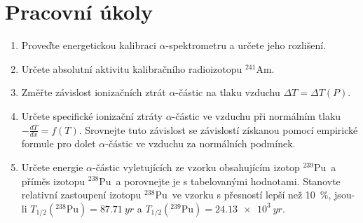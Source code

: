 \documentclass[a4paper]{article}
\author{Vladislav Wohlrath}
\newcommand{\Am}{$^{241}$Am}
\newcommand{\Puosm}{$^{238}$Pu}
\newcommand{\Pudev}{$^{239}$Pu}
\begin{document}
\begin{titlepage}

\end{titlepage}

\section*{Pracovní úkoly}
\begin{enumerate}
\item Proveďte energetickou kalibraci $\alpha$-spektrometru a určete jeho rozlišení.
\item Určete absolutní aktivitu kalibračního radioizotopu \Am.
\item Změřte závislost ionizačních ztrát $\alpha$-částic na tlaku vzduchu $\Delta T=\Delta T(P)$.
\item Určete specifické ionizační ztráty $\alpha$-částic ve vzduchu při normálním tlaku $-\frac{dT}{dx} = f(T)$. Srovnejte tuto závislost se závislostí získanou pomocí empirické formule pro dolet $\alpha$-částic ve vzduchu za normálních podmínek.
\item Určete energie $\alpha$-částic vyletujících ze vzorku obsahujícím izotop \Pudev~a příměs izotopu \Puosm~a porovnejte je s tabelovanými hodnotami. Stanovte relativní zastoupení izotopu \Puosm~ve vzorku s přesností lepší než \SI{10}{\percent}, jsou-li $T_{1/2}(^{238}\text{Pu}) = \SI{87.71}{yr}$ a $T_{1/2}(^{239}\text{Pu}) = \SI{24.13e3}{yr}$.
\end{enumerate}










\printbibliography[title={Seznam použité literatury}]
\end{document}
